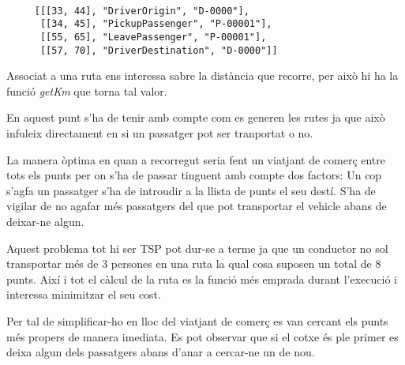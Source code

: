 \begin{verbatim}

     [[[33, 44], "DriverOrigin", "D-0000"],
      [[34, 45], "PickupPassenger", "P-00001"],
      [[55, 65], "LeavePassenger", "P-00001"],
      [[57, 70], "DriverDestination", "D-0000"]]
\end{verbatim}

Associat a una ruta ens interessa sabre la distància que recorre, per això hi ha la funció \emph{getKm}
que torna tal valor.

En aquest punt s'ha de tenir amb compte com es generen les rutes ja que això infuleix directament en
si un passatger pot ser tranportat o no.

La manera òptima en quan a recorregut seria fent un viatjant
de comerç entre tots els punts per on s'ha de passar tinguent amb compte dos factors:
Un cop s'agfa un passatger s'ha de introudir a la llista de punts el seu destí.
S'ha de vigilar de no agafar més passatgers del que pot transportar el vehicle
abans de deixar-ne algun.

Aquest problema tot hi ser TSP pot dur-se a terme ja que un conductor no sol transportar més de 3
persones en una ruta la qual cosa suposen un total de 8 punts. Així i tot el càlcul de la ruta
es la funció més emprada durant l'execució i interessa minimitzar el seu cost.

Per tal de simplificar-ho en lloc del viatjant de comerç es van cercant els punts més propers de
manera imediata. Es pot observar que si el cotxe és ple primer es deixa algun dels passatgers
abans d'anar a cercar-ne un de nou.

